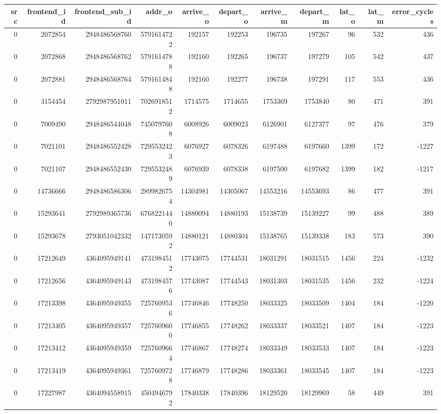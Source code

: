 \begin{tabular}{rrrrrrrrrrr}
\toprule
src & frontend\_id & frontend\_sub\_id & addr\_o & arrive\_o & depart\_o & arrive\_m & depart\_m & lat\_o & lat\_m & error\_cycles \\
\midrule
0 & 2072854 & 2948486568760 & 5791614722 & 192157 & 192253 & 196735 & 197267 & 96 & 532 & 436 \\
0 & 2072868 & 2948486568762 & 5791614788 & 192160 & 192265 & 196737 & 197279 & 105 & 542 & 437 \\
0 & 2072881 & 2948486568764 & 5791614848 & 192160 & 192277 & 196738 & 197291 & 117 & 553 & 436 \\
0 & 3154454 & 2792987951011 & 7026918512 & 1714575 & 1714655 & 1753369 & 1753840 & 80 & 471 & 391 \\
0 & 7009490 & 2948486544048 & 7450797608 & 6008926 & 6009023 & 6126901 & 6127377 & 97 & 476 & 379 \\
0 & 7021101 & 2948486552428 & 7295532423 & 6076927 & 6078326 & 6197488 & 6197660 & 1399 & 172 & -1227 \\
0 & 7021107 & 2948486552430 & 7295532489 & 6076939 & 6078338 & 6197500 & 6197682 & 1399 & 182 & -1217 \\
0 & 14736666 & 2948486586306 & 2899826754 & 14304981 & 14305067 & 14553216 & 14553693 & 86 & 477 & 391 \\
0 & 15293641 & 2792989365736 & 6768221440 & 14880094 & 14880193 & 15138739 & 15139227 & 99 & 488 & 389 \\
0 & 15293678 & 2793051042332 & 1471730592 & 14880121 & 14880304 & 15138765 & 15139338 & 183 & 573 & 390 \\
0 & 17212649 & 4364095949141 & 4731984512 & 17743075 & 17744531 & 18031291 & 18031515 & 1456 & 224 & -1232 \\
0 & 17212656 & 4364095949143 & 4731984576 & 17743087 & 17744543 & 18031303 & 18031535 & 1456 & 232 & -1224 \\
0 & 17213398 & 4364095949355 & 7257609536 & 17746846 & 17748250 & 18033325 & 18033509 & 1404 & 184 & -1220 \\
0 & 17213405 & 4364095949357 & 7257609600 & 17746855 & 17748262 & 18033337 & 18033521 & 1407 & 184 & -1223 \\
0 & 17213412 & 4364095949359 & 7257609664 & 17746867 & 17748274 & 18033349 & 18033533 & 1407 & 184 & -1223 \\
0 & 17213419 & 4364095949361 & 7257609728 & 17746879 & 17748286 & 18033361 & 18033545 & 1407 & 184 & -1223 \\
0 & 17227987 & 4364094558915 & 4504946792 & 17840338 & 17840396 & 18129520 & 18129969 & 58 & 449 & 391 \\

\end{tabular}
